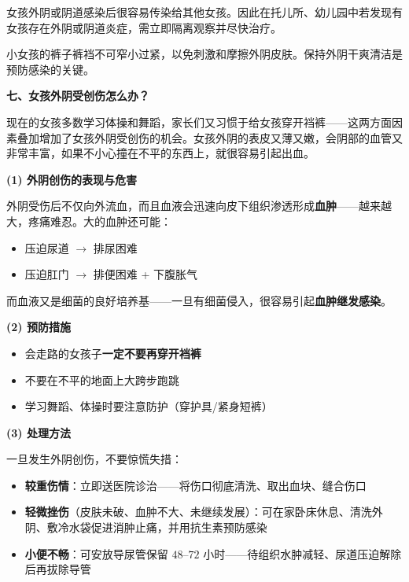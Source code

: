 \begin{enumerate}
\begin{enumerate}
女孩外阴或阴道感染后很容易传染给其他女孩。因此在托儿所、幼儿园中若发现有女孩存在外阴或阴道炎症，需立即隔离观察并尽快治疗。
\end{enumerate}

\begin{tcolorbox}[colback=pink!5!white,colframe=red!50!black,title=贴心小叮咛]
小女孩的裤子裤裆不可窄小过紧，以免刺激和摩擦外阴皮肤。保持外阴干爽清洁是预防感染的关键。
\end{tcolorbox}

\vspace{0.8em}
\noindent\textbf{七、女孩外阴受创伤怎么办？}

现在的女孩多数学习体操和舞蹈，家长们又习惯于给女孩穿开裆裤——这两方面因素叠加增加了女孩外阴受创伤的机会。女孩外阴的表皮又薄又嫩，会阴部的血管又非常丰富，如果不小心撞在不平的东西上，就很容易引起出血。

\vspace{0.5em}
\noindent\textbf{(1) 外阴创伤的表现与危害}

外阴受伤后不仅向外流血，而且血液会迅速向皮下组织渗透形成\textbf{血肿}——越来越大，疼痛难忍。大的血肿还可能：
\begin{itemize}
	\item 压迫尿道 $\rightarrow$ 排尿困难
	\item 压迫肛门 $\rightarrow$ 排便困难 + 下腹胀气
\end{itemize}

而血液又是细菌的良好培养基——一旦有细菌侵入，很容易引起\textbf{血肿继发感染}。

\vspace{0.3em}
\noindent\textbf{(2) 预防措施}

\begin{itemize}
	\item 会走路的女孩子\textbf{一定不要再穿开裆裤}
	\item 不要在不平的地面上大跨步跑跳
	\item 学习舞蹈、体操时要注意防护（穿护具/紧身短裤）
\end{itemize}

\vspace{0.3em}
\noindent\textbf{(3) 处理方法}

一旦发生外阴创伤，不要惊慌失措：
\begin{itemize}
	\item \textbf{较重伤情}：立即送医院诊治——将伤口彻底清洗、取出血块、缝合伤口
	\item \textbf{轻微挫伤}（皮肤未破、血肿不大、未继续发展）：可在家卧床休息、清洗外阴、敷冷水袋促进消肿止痛，并用抗生素预防感染
	\item \textbf{小便不畅}：可安放导尿管保留 $48$--$72$ 小时——待组织水肿减轻、尿道压迫解除后再拔除导管
\end{itemize}


\end{enumerate}
